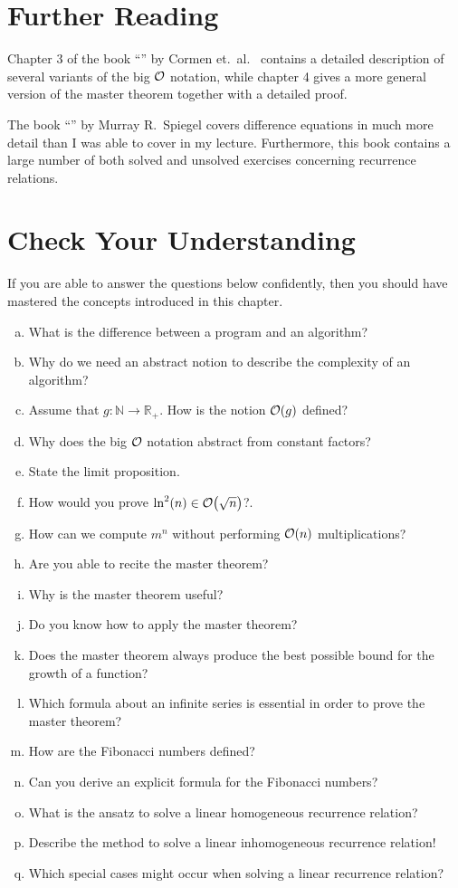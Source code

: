 \section{Further Reading}
Chapter 3 of the book ``'' by Cormen et.~al.~\cite{cormen:09}
contains a detailed description of several variants of the big $\mathcal{O}$ notation, while
chapter 4 gives a more general version of the master theorem together with a detailed proof.

The book ``'' by Murray R.~Spiegel
\cite{spiegel:1971} covers difference equations in much more detail than I was able to cover in my lecture.
Furthermore, this book contains a large number of both solved and unsolved exercises concerning
recurrence relations. 


\section{Check Your Understanding}
If you are able to answer the questions below confidently, then you should have mastered the concepts
introduced in this chapter.
\begin{enumerate}[(a)]
\item What is the difference between a program and an algorithm?
\item Why do we need an abstract notion to describe the complexity of an algorithm?  
\item Assume that $g:\mathbb{N} \rightarrow \mathbb{R}_+$.  How is the notion $\mathcal{O}(g)$ defined?
\item Why does the big $\mathcal{O}$ notation abstract from constant factors?  
\item State the limit proposition.
\item How would you prove $\ln^2(n) \in \mathcal{O}\bigl(\sqrt{n}\bigr)$?.
\item How can we compute $m^n$ without performing $\mathcal{O}(n)$ multiplications?
\item Are you able to recite the master theorem?
\item Why is the master theorem useful?
\item Do you know how to apply the master theorem?
\item Does the master theorem always produce the best possible bound for the growth of a function?  
\item Which formula about an infinite series is essential in order to prove the master theorem?
\item How are the Fibonacci numbers defined?
\item Can you derive an explicit formula for the Fibonacci numbers?
\item What is the ansatz to solve a linear homogeneous recurrence relation?
\item Describe the method to solve a linear inhomogeneous recurrence relation!
\item Which special cases might occur when solving a linear recurrence relation?
\end{enumerate}

